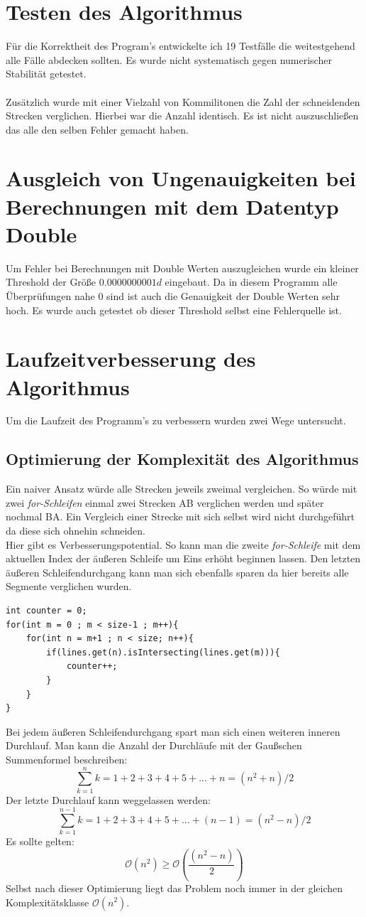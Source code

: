 \documentclass[conference]{IEEEtran}
\begin{document}
\section{Testen des Algorithmus}
Für die Korrektheit des Program's entwickelte ich 19 Testfälle die weitestgehend alle Fälle abdecken sollten. Es wurde nicht systematisch gegen numerischer Stabilität getestet.\\
\\
Zusätzlich wurde mit einer Vielzahl von Kommilitonen die Zahl der schneidenden Strecken verglichen. Hierbei war die Anzahl identisch. Es ist nicht auszuschließen das alle den selben Fehler gemacht haben.

\section{Ausgleich von Ungenauigkeiten bei Berechnungen mit dem Datentyp Double}
Um Fehler bei Berechnungen mit Double Werten auszugleichen wurde ein kleiner Threshold der Größe $0.0000000001d$ eingebaut. Da in diesem Programm alle Überprüfungen nahe 0 sind ist auch die Genauigkeit der Double Werten sehr hoch. Es wurde auch getestet ob dieser Threshold selbst eine Fehlerquelle ist.

\section{Laufzeitverbesserung des Algorithmus}
Um die Laufzeit des Programm's zu verbessern wurden zwei Wege untersucht.
\subsection{Optimierung der Komplexität des Algorithmus}
Ein naiver Ansatz würde alle Strecken jeweils zweimal vergleichen. So würde mit zwei \textit{for-Schleifen} einmal zwei Strecken AB verglichen werden und später nochmal BA. Ein Vergleich einer Strecke mit sich selbst wird nicht durchgeführt da diese sich ohnehin schneiden.\\
Hier gibt es Verbesserungspotential. So kann man die zweite \textit{for-Schleife} mit dem aktuellen Index der äußeren Schleife um Eins erhöht beginnen lassen. Den letzten äußeren Schleifendurchgang kann man sich ebenfalls sparen da hier bereits alle Segmente verglichen wurden.
\begin{lstlisting}
int counter = 0;
for(int m = 0 ; m < size-1 ; m++){
	for(int n = m+1 ; n < size; n++){
		if(lines.get(n).isIntersecting(lines.get(m))){
			counter++;
		}
	}
}
\end{lstlisting}
Bei jedem äußeren Schleifendurchgang spart man sich einen weiteren inneren Durchlauf.
Man kann die Anzahl der Durchläufe mit der Gaußschen Summenformel beschreiben:
\[ \sum_{k=1}^{n} k = 1+2+3+4+5+...+n = (n^2 + n) / 2 \]
Der letzte Durchlauf kann weggelassen werden:
\[ \sum_{k=1}^{n-1} k = 1+2+3+4+5+...+(n-1) = (n^2 - n) / 2 \]
Es sollte gelten:
\[ \mathcal{O}(n^2) \geq \mathcal{O}(\frac{(n^2 - n)}{2}) \]
Selbst nach dieser Optimierung liegt das Problem noch immer in der gleichen Komplexitätsklasse $\mathcal{O}(n^2)$.
\end{document}
